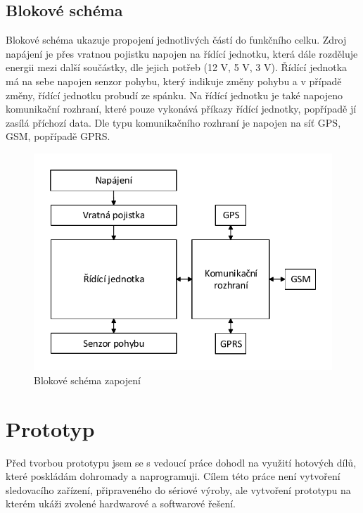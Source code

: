 \documentclass[FM,BP]{tulthesis}  %
\begin{document}
\section{Blokové schéma}
Blokové schéma ukazuje propojení jednotlivých částí do funkčního celku. Zdroj napájení je přes vratnou pojistku napojen na řídící jednotku, která dále rozděluje energii mezi další součástky, dle jejich potřeb (12 V, 5 V, 3 V). Řídící jednotka má na sebe napojen senzor pohybu, který indikuje změny pohybu a v případě změny, řídící jednotku probudí ze spánku. Na řídící jednotku je také napojeno komunikační rozhraní, které pouze vykonává příkazy řídící jednotky, popřípadě jí zasílá příchozí data. Dle typu komunikačního rozhraní je napojen na síť GPS, GSM, popřípadě GPRS.

\begin{figure}[H]
\begin{center}
\includegraphics[width=\textwidth]{graphs/schema_blokove.pdf}
\caption{Blokové schéma zapojení}
\label{image}
\end{center}
\end{figure}


\chapter{Prototyp}
Před tvorbou prototypu jsem se s vedoucí práce dohodl na využití hotových dílů, které poskládám dohromady a naprogramuji. Cílem této práce není vytvoření sledovacího zařízení, připraveného do sériové výroby, ale vytvoření prototypu na kterém ukáži zvolené hardwarové a softwarové řešení.
\end{document}
